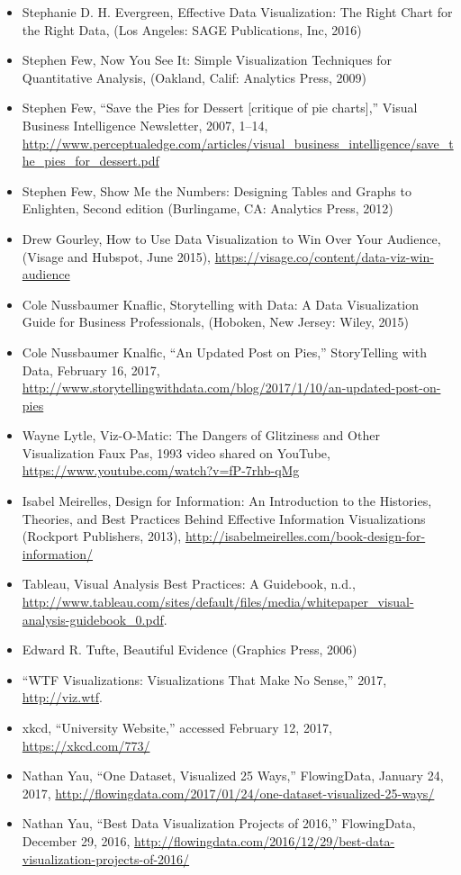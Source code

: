 \documentclass[
  english,
]{book}
\begin{document}
\begin{itemize}
\item
  Stephanie D. H. Evergreen, Effective Data Visualization: The Right Chart for the Right Data, (Los Angeles: SAGE Publications, Inc, 2016)
\item
  Stephen Few, Now You See It: Simple Visualization Techniques for Quantitative Analysis, (Oakland, Calif: Analytics Press, 2009)
\item
  Stephen Few, ``Save the Pies for Dessert {[}critique of pie charts{]},'' Visual Business Intelligence Newsletter, 2007, 1--14, \url{http://www.perceptualedge.com/articles/visual_business_intelligence/save_the_pies_for_dessert.pdf}
\item
  Stephen Few, Show Me the Numbers: Designing Tables and Graphs to Enlighten, Second edition (Burlingame, CA: Analytics Press, 2012)
\item
  Drew Gourley, How to Use Data Visualization to Win Over Your Audience, (Visage and Hubspot, June 2015), \url{https://visage.co/content/data-viz-win-audience}
\item
  Cole Nussbaumer Knaflic, Storytelling with Data: A Data Visualization Guide for Business Professionals, (Hoboken, New Jersey: Wiley, 2015)
\item
  Cole Nussbaumer Knalfic, ``An Updated Post on Pies,'' StoryTelling with Data, February 16, 2017, \url{http://www.storytellingwithdata.com/blog/2017/1/10/an-updated-post-on-pies}
\item
  Wayne Lytle, Viz-O-Matic: The Dangers of Glitziness and Other Visualization Faux Pas, 1993 video shared on YouTube, \url{https://www.youtube.com/watch?v=fP-7rhb-qMg}
\item
  Isabel Meirelles, Design for Information: An Introduction to the Histories, Theories, and Best Practices Behind Effective Information Visualizations (Rockport Publishers, 2013), \url{http://isabelmeirelles.com/book-design-for-information/}
\item
  Tableau, Visual Analysis Best Practices: A Guidebook, n.d., \url{http://www.tableau.com/sites/default/files/media/whitepaper_visual-analysis-guidebook_0.pdf}.
\item
  Edward R. Tufte, Beautiful Evidence (Graphics Press, 2006)
\item
  ``WTF Visualizations: Visualizations That Make No Sense,'' 2017, \url{http://viz.wtf}.
\item
  xkcd, ``University Website,'' accessed February 12, 2017, \url{https://xkcd.com/773/}
\item
  Nathan Yau, ``One Dataset, Visualized 25 Ways,'' FlowingData, January 24, 2017, \url{http://flowingdata.com/2017/01/24/one-dataset-visualized-25-ways/}
\item
  Nathan Yau, ``Best Data Visualization Projects of 2016,'' FlowingData, December 29, 2016, \url{http://flowingdata.com/2016/12/29/best-data-visualization-projects-of-2016/}
\end{itemize}
\end{document}
